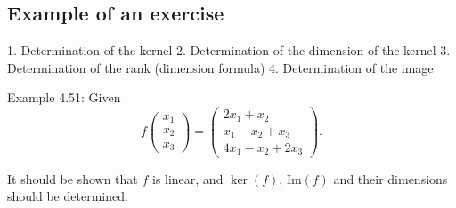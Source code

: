 \subsection{Example of an exercise}

1.  Determination of the kernel
2.  Determination of the dimension of the kernel
3.  Determination of the rank (dimension formula)
4.  Determination of the image

Example 4.51: Given
\[
f\begin{pmatrix}
x_1 \\
x_2 \\
x_3
\end{pmatrix} =
\begin{pmatrix}
2x_1 + x_2 \\
x_1 - x_2 + x_3 \\
4x_1 - x_2 + 2x_3
\end{pmatrix} .
\]

It should be shown that $f$ is linear, and $\ker(f)$, $\text{Im}(f)$ and their dimensions should be determined.

